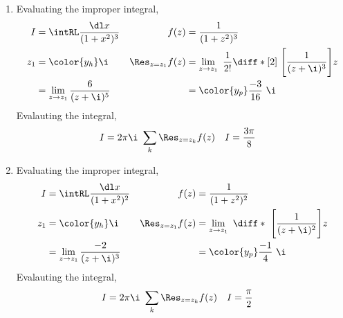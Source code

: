 \begin{enumerate}
    \item Evaluating the improper integral,
          \begin{align}
              I                   & = \intRL \frac{\dl x}{(1 + x^2)^3}        &
              f(z)                & = \frac{1}{(1 + z^2)^3}                     \\
              z_1                 & = \color{y_h} \i                          &
              \Res_{z = z_1} f(z) & = \lim_{z \to z_1}\ \frac{1}{2!}\diff*[2]
              {\ \Bigg[\frac{1} {(z + \i)^3}\Bigg]}{z}                          \\
                                  & = \lim_{z \to z_1}\frac{6}{(z + \i)^5}    &
                                  & = \color{y_p} \frac{-3}{16}\ \i
          \end{align}
          Evalauting the integral,
          \begin{align}
              I & = 2\pi\i\ \sum_{k} \Res_{z = z_k} f(z) &
              I & = \frac{3\pi}{8}
          \end{align}

    \item Evaluating the improper integral,
          \begin{align}
              I                   & = \intRL \frac{\dl x}{(1 + x^2)^2}      &
              f(z)                & = \frac{1}{(1 + z^2)^2}                   \\
              z_1                 & = \color{y_h} \i                        &
              \Res_{z = z_1} f(z) & = \lim_{z \to z_1}\ \diff*
              {\ \Bigg[\frac{1} {(z + \i)^2}\Bigg]}{z}                        \\
                                  & = \lim_{z \to z_1}\frac{-2}{(z + \i)^3} &
                                  & = \color{y_p} \frac{-1}{4}\ \i
          \end{align}
          Evalauting the integral,
          \begin{align}
              I & = 2\pi\i\ \sum_{k} \Res_{z = z_k} f(z) &
              I & = \frac{\pi}{2}
          \end{align}


\end{enumerate}
